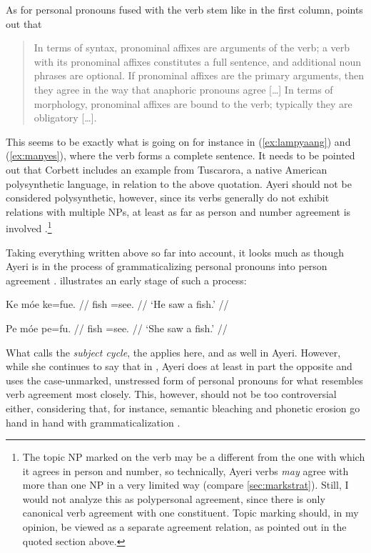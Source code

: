 As for personal pronouns fused with the verb stem like in the first column, 
\citeauthor{corbett2006} points out that

\blockcquote[99--100]{corbett2006}{In terms of syntax, pronominal affixes are 
arguments of the verb; a verb with its pronominal affixes constitutes a full 
sentence, and additional noun phrases are optional. If pronominal affixes are 
the primary arguments, then they agree in the way that anaphoric pronouns agree 
[…] In terms of morphology, pronominal affixes are bound to the verb; typically 
they are obligatory […].}

This seems to be exactly what is going on for instance in (\ref{ex:lampyaang}) 
and (\ref{ex:manyes}), where the verb forms a complete sentence. It needs to be 
pointed out that Corbett includes an example from Tuscarora, a native American 
polysynthetic language, in relation to the above quotation. Ayeri should not be 
considered polysynthetic, however, since its verbs generally do not exhibit 
relations with multiple NPs, at least as far as person and number agreement is 
involved \citep[45--46]{comrie1989}.\footnote{The topic NP marked on the verb 
may be a different from the one with which it agrees in person and number, so 
technically, Ayeri verbs \emph{may} agree with more than one NP in a very 
limited way (compare \autoref{sec:markstrat}). Still, I would not analyze this 
as polypersonal agreement, since there is only canonical verb agreement with 
one constituent. Topic marking should, in my opinion, be viewed as a separate 
agreement relation, as pointed out in the quoted section above.}

Taking everything written above so far into account, it looks much as though 
Ayeri is in the process of grammaticalizing personal pronouns into person 
agreement \parencites[42--45]{lehmann2015}[493--497]{vangelderen2011}. 
\citet[76--77]{corbett2006} illustrates an early stage of such a process:

\pex %
\a\begingl{}%
	\gla Ke móe ke=fue.  //
	\glb \TsgM{} fish \TsgM{}=​see.\TsgM{} {} //
	\glft `He saw a fish.' //
\endgl

\a\begingl
	\gla Pe móe pe=fu.  //
	\glb \TsgF{} fish \TsgF{}=​see.\TsgF{} {} //
	\glft `She saw a fish.' //
\endgl

\xe

What \citeauthor{vangelderen2011} calls the \emph{subject cycle}, the 
 applies here, and as well in 
Ayeri. However, while she continues to say that in 
, Ayeri does at least in part the 
opposite and uses the case-unmarked, unstressed form of personal pronouns for 
what resembles verb agreement most closely. This, however, should not be too 
controversial either, considering that, for instance, semantic bleaching and 
phonetic erosion go hand in hand with grammaticalization 
\parencites[136--137]{lehmann2015}[497]{vangelderen2011}.


